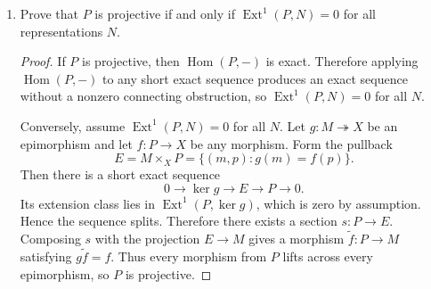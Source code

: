 \documentclass[11pt, a4paper]{article}
\newcommand{\Hom}{\operatorname{Hom}}
\newcommand{\Ext}{\operatorname{Ext}}
\begin{document}
\begin{enumerate}[leftmargin=*, label=\textbf{\arabic*.}]
\begin{enumerate}[label=(\alph*)]
\begin{proof}
We compute the Auslander--Reiten translate using a minimal projective resolution.
The projective representation $P(1)$ is $S(1)$, and
\[
P(2):\quad k^2\xleftarrow{\binom{1}{0},\binom{0}{1}} k.
\]
For $\lambda\in k$, the projective cover $P(2)\twoheadrightarrow M_\lambda$ is the identity at vertex $2$ and the row $(1\;\lambda):k^2\to k$ at vertex $1$. Its kernel is $P(1)$, embedded at vertex $1$ by the vector $(-\lambda,1)^T$. Hence
\[
0\to P(1)\xrightarrow{u_\lambda}P(2)\to M_\lambda\to 0
\]
is a minimal projective resolution.
Applying the Nakayama functor gives
\[
0\to \tau M_\lambda\to I(1)\xrightarrow{\nu u_\lambda}I(2).
\]
Now $I(1)$ has vector spaces $k$ at vertex $1$ and $k^2$ at vertex $2$, with arrow maps $(1\;0)$ and $(0\;1)$. The map $\nu u_\lambda$ at vertex $2$ is the row $(-\lambda\;1)$, so its kernel is the line spanned by $(1,\lambda)^T$. Restricted to this line, the two arrow maps are $1$ and $\lambda$. Thus
\[
\tau M_\lambda\cong M_\lambda.
\]
For $\lambda=\infty$, the same computation uses the embedding $P(1)\to P(2)$ by $(1,0)^T$; the kernel of the dual row is spanned by $(0,1)^T$, giving arrow maps $(0,1)$, hence $\tau M_\infty\cong M_\infty$.
\end{proof}
\end{enumerate}

\item Prove that $P$ is projective if and only if $\Ext^1(P,N)=0$ for all representations $N$.

\begin{proof}
If $P$ is projective, then $\Hom(P,-)$ is exact. Therefore applying $\Hom(P,-)$ to any short exact sequence produces an exact sequence without a nonzero connecting obstruction, so $\Ext^1(P,N)=0$ for all $N$.

Conversely, assume $\Ext^1(P,N)=0$ for all $N$. Let $g:M\twoheadrightarrow X$ be an epimorphism and let $f:P\to X$ be any morphism. Form the pullback
\[
E=M\times_X P=\{(m,p):g(m)=f(p)\}.
\]
Then there is a short exact sequence
\[
0\to \ker g\to E\to P\to 0.
\]
Its extension class lies in $\Ext^1(P,\ker g)$, which is zero by assumption. Hence the sequence splits. Therefore there exists a section $s:P\to E$. Composing $s$ with the projection $E\to M$ gives a morphism $\widetilde f:P\to M$ satisfying $g\widetilde f=f$. Thus every morphism from $P$ lifts across every epimorphism, so $P$ is projective.
\end{proof}


\end{enumerate}
\end{document}
